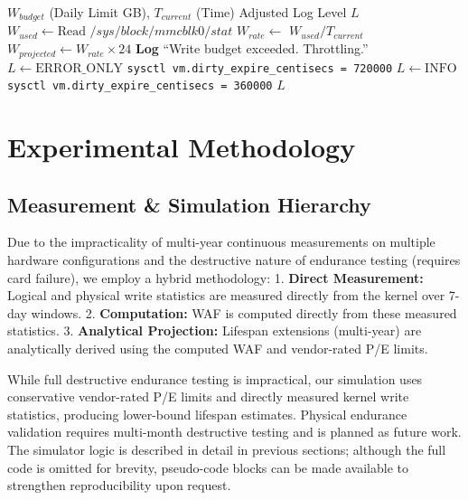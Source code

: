 \documentclass[conference]{IEEEtran}
\begin{document}
\begin{algorithm}[h]
\caption{Adaptive Write Throttling Daemon}
\begin{algorithmic}[1]
\REQUIRE $W_{budget}$ (Daily Limit GB), $T_{current}$ (Time)
\ENSURE Adjusted Log Level $L$
\STATE $W_{used} \leftarrow \text{Read } /sys/block/mmcblk0/stat$
\STATE $W_{rate} \leftarrow $ $W_{used} / T_{current}$
\STATE $W_{projected} \leftarrow W_{rate} \times 24$
    \STATE \textbf{Log} ``Write budget exceeded. Throttling.''
    \STATE $L \leftarrow \text{ERROR\_ONLY}$
    \STATE \texttt{sysctl vm.dirty\_expire\_centisecs = 720000}
\ELSE
    \STATE $L \leftarrow \text{INFO}$
    \STATE \texttt{sysctl vm.dirty\_expire\_centisecs = 360000}
\ENDIF
\RETURN $L$
\end{algorithmic}
\label{alg:monitor}
\end{algorithm}

\section{Experimental Methodology}

\subsection{Measurement \& Simulation Hierarchy}

Due to the impracticality of multi-year continuous measurements on multiple hardware configurations and the destructive nature of endurance testing (requires card failure), we employ a hybrid methodology:
1. \textbf{Direct Measurement:} Logical and physical write statistics are measured directly from the kernel over 7-day windows.
2. \textbf{Computation:} WAF is computed directly from these measured statistics.
3. \textbf{Analytical Projection:} Lifespan extensions (multi-year) are analytically derived using the computed WAF and vendor-rated P/E limits.

While full destructive endurance testing is impractical, our simulation uses conservative vendor-rated P/E limits and directly measured kernel write statistics, producing lower-bound lifespan estimates. Physical endurance validation requires multi-month destructive testing and is planned as future work. The simulator logic is described in detail in previous sections; although the full code is omitted for brevity, pseudo-code blocks can be made available to strengthen reproducibility upon request.
\end{document}
